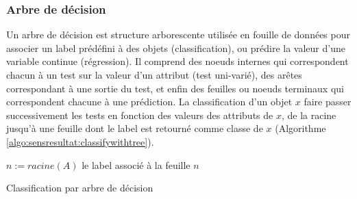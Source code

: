 \subsubsection{Arbre de décision}
Un arbre de décision est structure arborescente utilisée en fouille de données pour associer un label prédéfini à des objets (classification), ou prédire la valeur d'une variable continue (régression). Il comprend des noeuds internes qui correspondent chacun à un test sur la valeur d'un attribut (test uni-varié), des arêtes correspondant à une sortie du test, et enfin des feuilles ou noeuds terminaux qui correspondent chacune à une prédiction. La classification d'un objet $x$ faire passer successivement les tests en fonction des valeurs des attributs de $x$,  de la racine jusqu'à une feuille dont le label est retourné comme classe de $x$ (Algorithme \ref{algo:sensresultat:classifywithtree}).

\begin{algorithm}[ht] \small
	$n := racine(A)$ \; 
	\Return le label associé à la feuille $n$\;
	\caption{Classification par arbre de décision} \label{algo:sensresultat:classifywithtree}
\end{algorithm}

